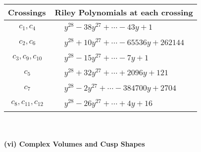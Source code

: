 \documentclass[1p]{elsarticle_modified}
\theoremstyle{definition}
\begin{document}
\begin{tabular}{m{50pt}|m{274pt}}
Crossings & \hspace{64pt}Riley Polynomials at each crossing \\
\hline $$\begin{aligned}c_{1},c_{4}\end{aligned}$$&$\begin{aligned}
&y^{28}-38 y^{27}+\cdots-43 y+1
\end{aligned}$\\
\hline $$\begin{aligned}c_{2},c_{6}\end{aligned}$$&$\begin{aligned}
&y^{28}+10 y^{27}+\cdots-65536 y+262144
\end{aligned}$\\
\hline $$\begin{aligned}c_{3},c_{9},c_{10}\end{aligned}$$&$\begin{aligned}
&y^{28}-15 y^{27}+\cdots-7 y+1
\end{aligned}$\\
\hline $$\begin{aligned}c_{5}\end{aligned}$$&$\begin{aligned}
&y^{28}+32 y^{27}+\cdots+2096 y+121
\end{aligned}$\\
\hline $$\begin{aligned}c_{7}\end{aligned}$$&$\begin{aligned}
&y^{28}-2 y^{27}+\cdots-384700 y+2704
\end{aligned}$\\
\hline $$\begin{aligned}c_{8},c_{11},c_{12}\end{aligned}$$&$\begin{aligned}
&y^{28}-26 y^{27}+\cdots+4 y+16
\end{aligned}$\\
\hline
\end{tabular}\\~\\
\newpage\flushleft \textbf{(vi) Complex Volumes and Cusp Shapes}
\end{document}

